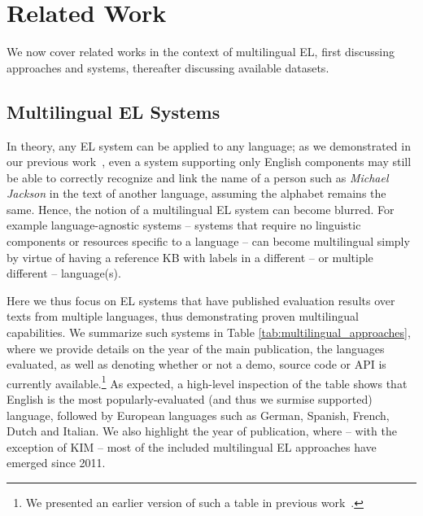 \documentclass{llncs}
\begin{document}
\section{Related Work}
\label{sec:relatedWork}

We now cover related works in the context of multilingual EL, first discussing approaches and systems, thereafter discussing available datasets.

\subsection{Multilingual EL Systems}
In theory, any EL system can be applied to any language; as we demonstrated in our previous work~\cite{Rosales-MendezP17}, even a system supporting only English components may still be able to correctly recognize and link the name of a person such as \textit{Michael Jackson} in the text of another language, assuming the alphabet remains the same. Hence, the notion of a multilingual EL system can become blurred. For example language-agnostic systems -- systems that require no linguistic components or resources specific to a language -- can become multilingual simply by virtue of having a reference KB with labels in a different -- or multiple different -- language(s). 

Here we thus focus on EL systems that have published evaluation results over texts from multiple languages, thus demonstrating proven multilingual capabilities. We summarize such systems in Table \ref{tab:multilingual_approaches}, where we provide details on the year of the main publication, the languages evaluated, as well as denoting whether or not a demo, source code or API is currently available.\footnote{We presented an earlier version of such a table in previous work~\cite{Rosales-MendezP17}.} As expected, a high-level inspection of the table shows that English is the most popularly-evaluated (and thus we surmise supported) language, followed by European languages such as German, Spanish, French, Dutch and Italian. We also highlight the year of publication, where -- with the exception of KIM \cite{KIM-popov2004kim} -- most of the included multilingual EL approaches have emerged since 2011.
\end{document}
